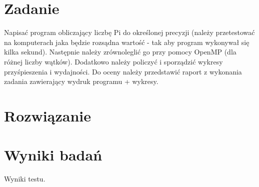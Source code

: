 

\def\titlelinea{Wydział Informatyki}
\def\titlelineb{Katedra Oprogramowania}
\def\titlelinec{Obliczenia równoległe}
\def\titlelined{Temat: Obliczanie wartości $\pi$ z wykorzystaniem wzoru Leibniza}
\def\wykonawca{inż. Rafał Selewońko}
\def\promotor{mgr inż. Paweł Zabielski}
\def\promotorstring{Prowadzący: } 
\def\data{13 grudnia 2013}





\chapter{Zadanie}

Napisać program obliczający liczbę Pi do określonej precyzji (należy przetestować na komputerach jaka będzie rozsądna wartość - tak aby program wykonywał się kilka sekund). Następnie należy zrównoleglić go przy pomocy OpenMP (dla różnej liczby wątków). Dodatkowo należy policzyć i sporządzić wykresy przyśpieszenia i wydajności. Do oceny należy przedstawić raport z wykonania zadania zawierający wydruk programu + wykresy.

\chapter{Rozwiązanie}

\noindent\begin{minipage}{\linewidth}

\end{minipage}

\noindent\begin{minipage}{\linewidth}

\end{minipage}

\noindent\begin{minipage}{\linewidth}

\end{minipage}

\chapter{Wyniki badań}

\begin{table}[t]
\centering
{}
\caption{Wyniki testu.}
\label{tabela}
\end{table}

